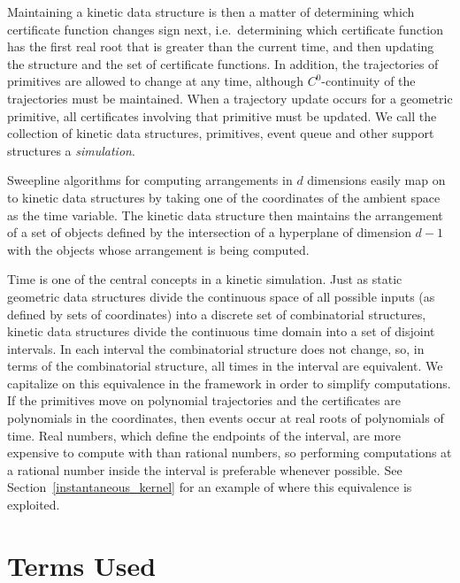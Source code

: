 Maintaining a kinetic data structure is then a matter of determining
which certificate function changes sign next, i.e.\ determining which
certificate function has the first real root that is greater than the
current time, and then updating the structure and the set of
certificate functions. In addition, the trajectories of primitives are
allowed to change at any time, although $C^0$-continuity of the
trajectories must be maintained.  When a trajectory update occurs for
a geometric primitive, all certificates involving that primitive must
be updated.  We call the collection of kinetic data structures,
primitives, event queue and other support structures a
{\em simulation}.

Sweepline algorithms for computing arrangements in $d$ dimensions
easily map on to kinetic data structures by taking one of the
coordinates of the ambient space as the time variable. The kinetic
data structure then maintains the arrangement of a set of objects
defined by the intersection of a hyperplane of dimension $d-1$ with
the objects whose arrangement is being computed. 


Time is one of the central concepts in a kinetic simulation.  Just as
static geometric data structures divide the continuous space of all
possible inputs (as defined by sets of coordinates) into a discrete
set of combinatorial structures, kinetic data structures divide the
continuous time domain into a set of disjoint intervals. In each
interval the combinatorial structure does not change, so, in terms of
the combinatorial structure, all times in the interval are equivalent.
We capitalize on this equivalence in the framework in order to
simplify computations. If the primitives move on polynomial
trajectories and the certificates are polynomials in the coordinates,
then events occur at real roots of polynomials of time. Real numbers,
which define the endpoints of the interval, are more expensive to
compute with than rational numbers, so performing computations at a
rational number inside the interval is preferable whenever
possible. See Section~\ref{instantaneous_kernel} for an example of
where this equivalence is exploited.

\section{Terms Used}
\label{sec:kds_terms}

